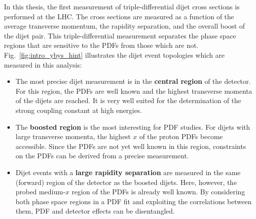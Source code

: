 In this thesis, the first measurement of triple-differential dijet cross
sections is performed at the LHC. The cross sections are measured as a function
of the average transverse momentum, the rapidity separation, and the overall
boost of the dijet pair. This triple-differential measurement separates the phase
space regions that are sensitive to the PDFs from those which are not.
Fig.~\ref{fig:intro_ybys_hint} illustrates the dijet event topologies which are
measured in this analysis:
%
\begin{itemize}
\setlength\itemsep{-3pt}
    \item The most precise dijet measurement is in the \textbf{central region}
        of the detector. For this region, the PDFs are well known and the highest transverse momenta
        of the dijets are reached. It is very well suited for the determination
        of the strong coupling constant at high energies.
    \item The \textbf{boosted region} is the most interesting for PDF studies.
        For dijets with large transverse momenta, the highest $x$ of the proton
        PDFs become accessible. Since the PDFs are not yet well known in this region,
        constraints on the PDFs can be derived from a precise
        measurement.
      \item Dijet events with a \textbf{large rapidity separation} are measured
          in the same (forward) region of the detector as the boosted dijets.
          Here, however, the probed medium-$x$ region of the PDFs is already well
          known. By considering both phase space regions in a PDF fit and exploiting the
          correlations between them, PDF and detector effects
          can be disentangled.
\end{itemize}
\vspace{-10pt}
%
